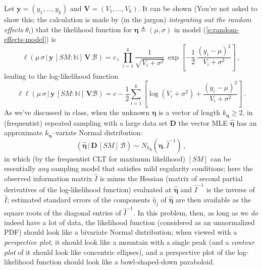 \documentclass[12pt]{article}
\newcommand{\given}{\, | \,}
\renewcommand{\i}[1]{\textit{#1}}
\begin{document}
Let $\bm{ y } = ( y_1, \dots, y_k )$ and $\bm{ V } = ( V_1, \dots, V_k )$. It can be shown (You're not asked to show this; the calculation is made by (in the jargon) \textit{integrating out the random effects} $\theta_i$) that the likelihood function for $\bm{ \eta } \triangleq ( \mu, \sigma )$ in model (\ref{e:random-effects-model}) is
\begin{equation} \label{e:aspirin-likelihood}
\ell ( \mu \, \sigma \given \bm{ y } \, [ SM \! \! : \mathbb{ N } ] \, \bm{ V } \, \mathcal{ B } ) = c_+ \, \prod_{ i = 1 }^k \frac{ 1 }{ \sqrt{ V_i + \sigma^2 } } \, \exp \left[ - \frac{ 1 }{ 2 } \, \frac{ ( y_i - \mu )^2 }{ V_i + \sigma^2 } \right] \, ,
\end{equation}
leading to the log-likelihood function
\begin{equation} \label{e:aspirin-log-likelihood}
\ell \ell ( \mu \, \sigma \given \bm{ y } \, [ SM \! \! : \mathbb{ N } ] \, \bm{ V } \mathcal{ B } ) = c - \frac{ 1 }{ 2 } \sum_{ i = 1 }^k \left[ \log ( V_i + \sigma^2 ) + \frac{ ( y_i - \mu )^2 }{ V_i + \sigma^2 } \right] \, .
\end{equation}
As we've discussed in class, when the unknown $\bm{ \eta }$ is a vector of length $k_{ \bm{ \eta } } \ge 2$, in (frequentist) repeated sampling with a large data set $\bm{ D }$ the vector MLE $\hat{ \bm{ \eta } }$ has an approximate $k_{ \bm{ \eta } }$--variate Normal distribution:
\begin{equation} \label{e:mle-big-k}
\left( \hat{ \bm{ \eta } } \given \bm{ D } \, [ SM ] \, \mathcal{ B } \right) \sim N_{ k_{ \bm{ \eta } } } \left( \bm{ \eta }, \hat{ I }^{ -1 } \right) \, ,
\end{equation}
in which (by the frequentist CLT for maximum likelihood) $[ SM ]$ can be essentially \i{any} sampling model that satisfies mild regularity conditions; here the observed information matrix $\hat{ I }$ is minus the Hessian (matrix of second partial derivatives of the log-likelihood function) evaluated at $\hat{ \bm{ \eta } }$ and $\hat{ I }^{ -1 }$ is the inverse of $\hat{ I }$; estimated standard errors of the components $\hat{ \eta }_j$ of $\hat{ \bm{ \eta } }$ are then available as the square roots of the diagonal entries of $\hat{ I }^{ -1 }$. In this problem, then, as long as we \textit{do} indeed have a lot of data, the likelihood function (considered as an unnormalized PDF) should look like a bivariate Normal distribution; when viewed with a \textit{perspective plot}, it should look like a mountain with a single peak (and a \textit{contour plot} of it should look like concentric ellipses), and a perspective plot of the log-likelihood function should look like a bowl-shaped-down paraboloid.
\end{document}
